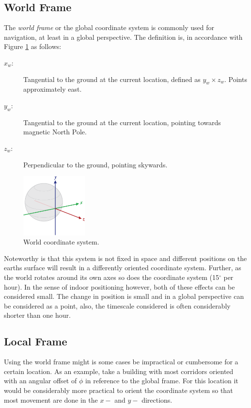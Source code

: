 \documentclass{LTHthesis}
\begin{document}
\subsection{World Frame}
%
The \emph{world frame} or the global coordinate system is commonly used for navigation, at least in a global perspective. The definition is, in accordance with Figure \ref{axis_globe} as follows:
%
\begin{description}
\item[$x_w$:] Tangential to the ground at the current location, defined as $y_w\times z_w$. Points approximately east. 
\item[$y_w$:] Tangential to the ground at the current location, pointing towards magnetic North Pole.
\item[$z_w$:] Perpendicular to the ground, pointing skywards.
\end{description}
%
\begin{figure}[!hbt]
\begin{center}

\includegraphics[width=0.3\textwidth ]{images/background_on_navigation/axis_globe.png}
\end{center}
\caption[]{World coordinate system.\footnotemark}\label{axis_globe}
\end{figure}
%
%
Noteworthy is that this system is not fixed in space and different positions on the earths surface will result in a differently oriented coordinate system. Further, as the world rotates around its own axes so does the coordinate system (15$^\circ$ per hour). In the sense of indoor positioning however, both of these effects can be considered small. The change in position is small and in a global perspective can be considered as a point, also, the timescale considered is often considerably shorter than one hour. 
%
\subsection{Local Frame}
%
Using the world frame might is some cases be impractical or cumbersome for a certain location. As an example, take a  building with most corridors oriented with an angular offset of $\phi$ in reference to the global frame. For this location it would be considerably more practical to orient the coordinate system so that most movement are done in the $x-$ and $y-$ directions.   
\end{document}

